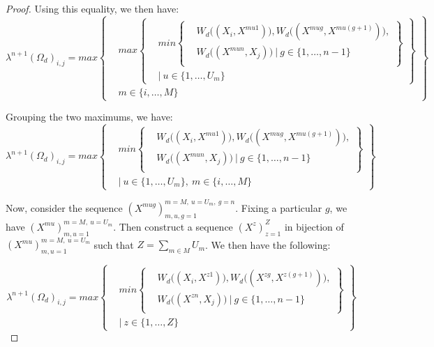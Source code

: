 \documentclass{article} %
\begin{document}
\begin{proof}
Using this equality, we then have:
\[
\lambda^{n+1}(\Omega_d)_{i,j} =max
\left\{
  \begin{aligned}
  &max
          \left\{
          \begin{aligned}
            &min\left\{
            \begin{aligned}
            &W_d\big((X_i,X^{mu1})\big), W_d\big((X^{mug},X^{mu(g+1)})\big), \\
            &W_d\big((X^{mun},X_j)\big)\ |\ g\in\{1,\ldots,n-1\}\\
            \end{aligned}
            \right\} \\
            &|\ u\in\{1,\ldots,U_m\}
          \end{aligned}
          \right\} \\
  & m\in\{i,\ldots,M\}
  \end{aligned}
\right\}
\]

Grouping the two maximums, we have:
\[
\lambda^{n+1}(\Omega_d)_{i,j} =max
\left\{
  \begin{aligned}
            &min\left\{
            \begin{aligned}
            &W_d\big((X_i,X^{mu1})\big), W_d\big((X^{mug},X^{mu(g+1)})\big), \\
            &W_d\big((X^{mun},X_j)\big)\ |\ g\in\{1,\ldots,n-1\}\\
            \end{aligned}
            \right\} \\
            &|\ u\in\{1,\ldots,U_m\},\ m\in\{i,\ldots,M\}
  \end{aligned}
\right\}
\]

Now, consider the sequence $(X^{mug})_{m,u,g=1}^{m=M,\ u=U_m,\ g=n}$. Fixing a particular $g$, we have $(X^{mu})_{m,u=1}^{m=M,\ u=U_m}$. Then construct a sequence $(X^z)_{z=1}^Z$ in bijection of $(X^{mu})_{m,u=1}^{m=M,\ u=U_m}$ such that $Z=\sum_{m\in M}U_m$. We then have the following: 

\[
\lambda^{n+1}(\Omega_d)_{i,j} =max
\left\{
  \begin{aligned}
            &min\left\{
            \begin{aligned}
            &W_d\big((X_i,X^{z1})\big), W_d\big((X^{zg},X^{z(g+1)})\big), \\
            &W_d\big((X^{zn},X_j)\big)\ |\ g\in\{1,\ldots,n-1\}\\
            \end{aligned}
            \right\} \\
            &|\ z\in\{1,\ldots,Z\}
  \end{aligned}
\right\}
\]


\end{proof}
\end{document}
